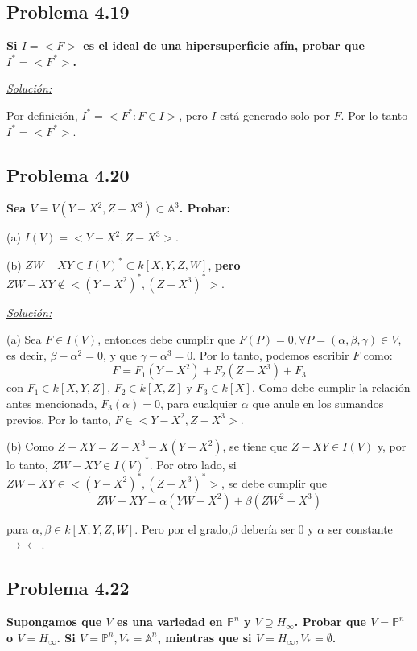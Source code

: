 \subsection{Problema 4.19}

\textbf{Si $I=<F>$ es el ideal de una hipersuperficie afín, probar que $I^*=<F^*>$.}

\underline{\textit{Solución:}}

\vspace{2mm}

Por definición, $I^*=<F^*: F\in I>$, pero $I$ está generado solo por $F$. Por lo tanto $I^*=<F^*>$.

\newpage
\subsection{Problema 4.20}

\textbf{Sea $V=V(Y-X^2,Z-X^3)\subset \mathbb{A}^3$. Probar:}

(a) $I(V)=<Y-X^2,Z-X^3>$.

(b) $ZW-XY\in I(V)^*\subset k[X,Y,Z,W]$, \textbf{pero} $ZW-XY\not \in <(Y-X^2)^*,(Z-X^3)^*>$.

\underline{\textit{Solución:}}

\vspace{2mm}

(a) Sea $F\in I(V)$, entonces debe cumplir que $F(P) = 0, \forall P=(\alpha,\beta,\gamma) \in V$, es decir, $\beta - \alpha^2=0$, y que $\gamma-\alpha^3=0$. Por lo tanto, podemos escribir $F$ como:
$$F= F_1(Y-X^2)+F_2(Z-X^3)+F_3 $$
con $F_1\in k[X,Y,Z]$, $F_2\in k[X,Z]$ y $F_3\in k[X]$. Como debe cumplir la relación antes mencionada, $F_3(\alpha)=0$, para cualquier $\alpha$ que anule en los sumandos previos. Por lo tanto, $F\in <Y-X^2,Z-X^3>$.  
\vspace{2mm}


(b) Como $Z-XY=Z-X^3-X(Y-X^2)$, se tiene que $Z-XY\in I(V)$ y, por lo tanto, $ZW-XY\in I(V)^*$. Por otro lado, si $ZW-XY\in <(Y-X^2)^*,(Z-X^3)^*>$, se debe cumplir que
$$ZW-XY=\alpha (YW-X^2)+ \beta (ZW^2-X^3) $$

para $\alpha,\beta \in k[X,Y,Z,W]$. Pero por el grado,$\beta $ debería ser 0 y $\alpha $ ser constante $\rightarrow \leftarrow $.

\subsection{Problema 4.22}

\textbf{Supongamos que $V$ es una variedad en $\mathbb{P}^n$ y $V\supseteq H_\infty$. Probar que $V=\mathbb{P}^n$ o $V=H_\infty$. Si $V=\mathbb{P}^n,V_*=\mathbb{A}^n$, mientras que si $V=H_\infty,V_*=\emptyset$.}

